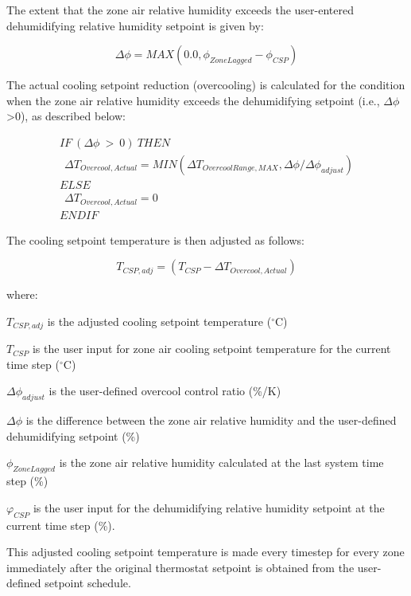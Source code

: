 The extent that the zone air relative humidity exceeds the user-entered dehumidifying relative humidity setpoint is given by:

\begin{equation}
\Delta \phi  = MAX \left( {0.0,{\phi_{ZoneLagged}} - {\phi_{CSP}}} \right)
\end{equation}

The actual cooling setpoint reduction (overcooling) is calculated for the condition when the zone air relative humidity exceeds the dehumidifying setpoint (i.e., \(\Delta \phi\) \textgreater{}0), as described below:

\begin{equation}
  \begin{array}{l}
    IF~({\Delta \phi}~>~0)~THEN \\
    ~~\Delta {T_{Overcool,Actual}} = MIN \left( {\Delta {T_{OvercoolRange,MAX}},{{\Delta \phi } / {\Delta {\phi_{adjust}}}}} \right) \\
    ELSE \\
    ~~\Delta {T_{Overcool,Actual}} = 0 \\
    END IF
  \end{array}
\end{equation}

The cooling setpoint temperature is then adjusted as follows:

\begin{equation}
{T_{CSP,adj}} = \left( {{T_{CSP}} - \Delta {T_{Overcool,Actual}}} \right)
\end{equation}

where:

\({T_{CSP,adj}}\) is the adjusted cooling setpoint temperature (\(^{\circ}\)C)

\({T_{CSP}}\) is the user input for zone air cooling setpoint temperature for the current time step (\(^{\circ}\)C)

\(\Delta {\phi_{adjust}}\) is the user-defined overcool control ratio (\%/K)

\(\Delta \phi\) is the difference between the zone air relative humidity and the user-defined dehumidifying setpoint (\%)

\({\phi_{ZoneLagged}}\) is the zone air relative humidity calculated at the last system time step (\%)

\({\varphi_{CSP}}\) is the user input for the dehumidifying relative humidity setpoint at the current time step (\%).

This adjusted cooling setpoint temperature is made every timestep for every zone immediately after the original thermostat setpoint is obtained from the user-defined setpoint schedule.

